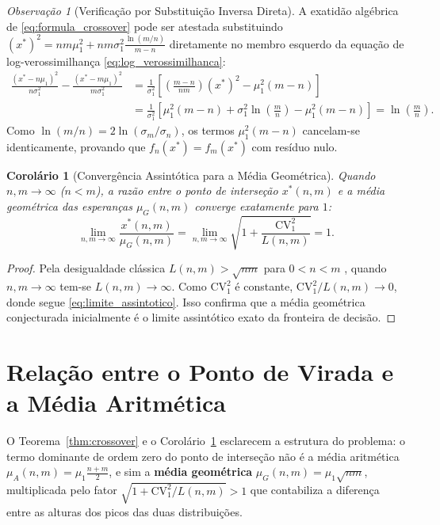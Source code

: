 \documentclass[11pt,a4paper]{article}
\newtheorem{corollary}[theorem]{Corolário}
\theoremstyle{definition}
\theoremstyle{remark}
\newtheorem{remark}[theorem]{Observação}
\begin{document}
\begin{remark}[Verificação por Substituição Inversa Direta]
\label{rem:substituicao}
A exatidão algébrica de \eqref{eq:formula_crossover} pode ser atestada substituindo $(x^*)^2 = nm\mu_1^2 + nm\sigma_1^2 \frac{\ln(m/n)}{m-n}$ diretamente no membro esquerdo da equação de log-verossimilhança \eqref{eq:log_verossimilhanca}:
\begin{align*}
\frac{(x^* - n\mu_1)^2}{n\sigma_1^2} - \frac{(x^* - m\mu_1)^2}{m\sigma_1^2}
&= \frac{1}{\sigma_1^2}\left[\left(\frac{m - n}{nm}\right)(x^*)^2 - \mu_1^2(m - n)\right] \\
&= \frac{1}{\sigma_1^2}\left[\mu_1^2(m - n) + \sigma_1^2\ln\!\left(\frac{m}{n}\right) - \mu_1^2(m - n)\right]
= \ln\!\left(\frac{m}{n}\right).
\end{align*}
Como $\ln(m/n) = 2\ln(\sigma_m / \sigma_n)$, os termos $\mu_1^2(m-n)$ cancelam-se identicamente, provando que $f_n(x^*) = f_m(x^*)$ com resíduo nulo.
\end{remark}

\begin{corollary}[Convergência Assintótica para a Média Geométrica]
\label{cor:assintotico}
Quando $n, m \to \infty$ ($n < m$), a razão entre o ponto de interseção $x^*(n,m)$ e a média geométrica das esperanças $\mu_G(n,m)$ converge exatamente para $1$:
\begin{equation}
\lim_{n, m \to \infty} \frac{x^*(n, m)}{\mu_G(n, m)} = \lim_{n, m \to \infty} \sqrt{1 + \frac{\mathrm{CV}_1^2}{L(n, m)}} = 1.
\label{eq:limite_assintotico}
\end{equation}
\end{corollary}

\begin{proof}
Pela desigualdade clássica $L(n,m) > \sqrt{nm}$ para $0 < n < m$ \cite{carlson1972}, quando $n, m \to \infty$ tem-se $L(n,m) \to \infty$. Como $\mathrm{CV}_1^2$ é constante, $\mathrm{CV}_1^2 / L(n,m) \to 0$, donde segue \eqref{eq:limite_assintotico}. Isso confirma que a média geométrica conjecturada inicialmente é o limite assintótico exato da fronteira de decisão.
\end{proof}

\section{Relação entre o Ponto de Virada e a Média Aritmética}
\label{sec:comparacao_medias}

O Teorema~\ref{thm:crossover} e o Corolário~\ref{cor:assintotico} esclarecem a estrutura do problema: o termo dominante de ordem zero do ponto de interseção não é a média aritmética $\mu_A(n,m) = \mu_1 \frac{n+m}{2}$, e sim a \textbf{média geométrica} $\mu_G(n,m) = \mu_1 \sqrt{nm}$, multiplicada pelo fator $\sqrt{1 + \mathrm{CV}_1^2 / L(n,m)} > 1$ que contabiliza a diferença entre as alturas dos picos das duas distribuições.
\end{document}
